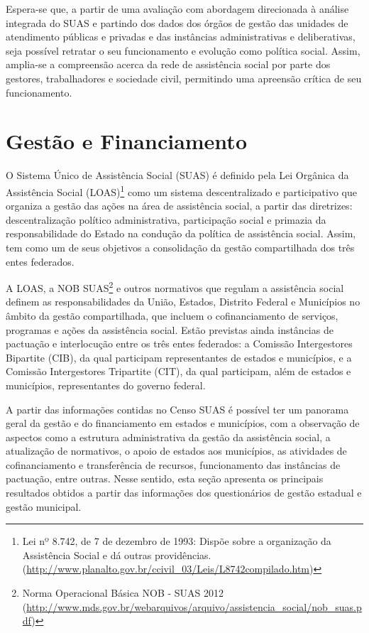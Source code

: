 \documentclass[
  brazilian]{report}
\begin{document}
Espera-se que, a partir de uma avaliação com abordagem direcionada à
análise integrada do SUAS e partindo dos dados dos órgãos de gestão das
unidades de atendimento públicas e privadas e das instâncias
administrativas e deliberativas, seja possível retratar o seu
funcionamento e evolução como política social. Assim, amplia-se a
compreensão acerca da rede de assistência social por parte dos gestores,
trabalhadores e sociedade civil, permitindo uma apreensão crítica de seu
funcionamento.

\hypertarget{gestuxe3o-e-financiamento}{%
\chapter{Gestão e Financiamento}\label{gestuxe3o-e-financiamento}}

O Sistema Único de Assistência Social (SUAS) é definido pela Lei
Orgânica da Assistência Social
(LOAS)\footnote{Lei nº 8.742, de 7 de dezembro de 1993: Dispõe sobre a organização da Assistência Social e dá outras providências. (\url{http://www.planalto.gov.br/ccivil_03/Leis/L8742compilado.htm})}
como um sistema descentralizado e participativo que organiza a gestão
das ações na área de assistência social, a partir das diretrizes:
descentralização político administrativa, participação social e primazia
da responsabilidade do Estado na condução da política de assistência
social. Assim, tem como um de seus objetivos a consolidação da gestão
compartilhada dos três entes federados.

A LOAS, a NOB
SUAS\footnote{Norma Operacional Básica NOB - SUAS 2012 (\url{http://www.mds.gov.br/webarquivos/arquivo/assistencia_social/nob_suas.pdf})}
e outros normativos que regulam a assistência social definem as
responsabilidades da União, Estados, Distrito Federal e Municípios no
âmbito da gestão compartilhada, que incluem o cofinanciamento de
serviços, programas e ações da assistência social. Estão previstas ainda
instâncias de pactuação e interlocução entre os três entes federados: a
Comissão Intergestores Bipartite (CIB), da qual participam
representantes de estados e municípios, e a Comissão Intergestores
Tripartite (CIT), da qual participam, além de estados e municípios,
representantes do governo federal.

A partir das informações contidas no Censo SUAS é possível ter um
panorama geral da gestão e do financiamento em estados e municípios, com
a observação de aspectos como a estrutura administrativa da gestão da
assistência social, a atualização de normativos, o apoio de estados aos
municípios, as atividades de cofinanciamento e transferência de
recursos, funcionamento das instâncias de pactuação, entre outras. Nesse
sentido, esta seção apresenta os principais resultados obtidos a partir
das informações dos questionários de gestão estadual e gestão municipal.
\end{document}
